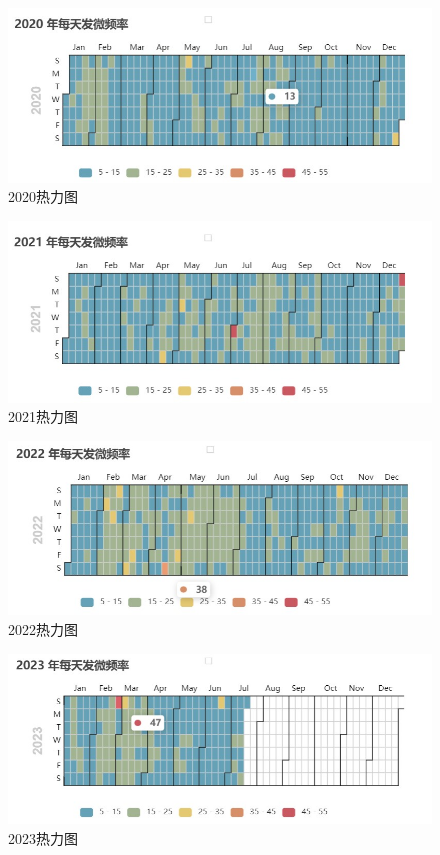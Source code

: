 \begin{figure}[H]
    \centering
    \includegraphics[width=12cm]{figure/2020.jpg}
    \caption{2020热力图} \label{fig:2020}
\end{figure}
\begin{figure}[H]
    \centering
    \includegraphics[width=12cm]{figure/2021.jpg}
    \caption{2021热力图} \label{fig:2021}
\end{figure}
\begin{figure}[H]
    \centering
    \includegraphics[width=12cm]{figure/2022.jpg}
    \caption{2022热力图} \label{fig:2022}
\end{figure}    
\begin{figure}[H]
    \centering
    \includegraphics[width=12cm]{figure/2023.jpg}
    \caption{2023热力图} \label{fig:2023}
\end{figure}    

